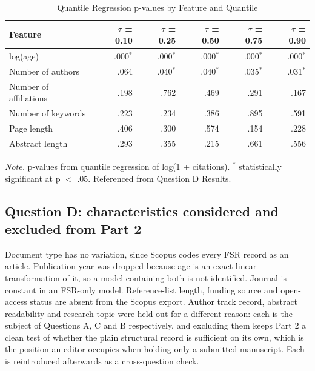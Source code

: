 \documentclass[11pt,a4paper]{article}
\newcommand{\tablenote}[1]{\par\smallskip\parbox{\linewidth}{\footnotesize\textit{Note.} #1}}
\begin{document}
\begin{table}[htbp]
\centering
\small
\caption{Quantile Regression p-values by Feature and Quantile}
\label{tab:qd_qr}
\begin{tabular}{lrrrrr}
\toprule
Feature & $\tau$ = 0.10 & $\tau$ = 0.25 & $\tau$ = 0.50 & $\tau$ = 0.75 & $\tau$ = 0.90 \\
\midrule
log(age) & .000$^{*}$ & .000$^{*}$ & .000$^{*}$ & .000$^{*}$ & .000$^{*}$ \\
Number of authors & .064 & .040$^{*}$ & .040$^{*}$ & .035$^{*}$ & .031$^{*}$ \\
Number of affiliations & .198 & .762 & .469 & .291 & .167 \\
Number of keywords & .223 & .234 & .386 & .895 & .591 \\
Page length & .406 & .300 & .574 & .154 & .228 \\
Abstract length & .293 & .355 & .215 & .661 & .556 \\
\bottomrule
\end{tabular}
\tablenote{p-values from quantile regression of log(1 + citations). $^{*}$ statistically significant at p $<$ .05. Referenced from Question D Results.}
\end{table}

\subsection{Question D: characteristics considered and excluded from Part 2}\label{app:qd_excluded}

Document type has no variation, since Scopus codes every FSR record as an article. Publication year was dropped because age is an exact linear transformation of it, so a model containing both is not identified. Journal is constant in an FSR-only model. Reference-list length, funding source and open-access status are absent from the Scopus export. Author track record, abstract readability and research topic were held out for a different reason: each is the subject of Questions A, C and B respectively, and excluding them keeps Part 2 a clean test of whether the plain structural record is sufficient on its own, which is the position an editor occupies when holding only a submitted manuscript. Each is reintroduced afterwards as a cross-question check.
\end{document}
